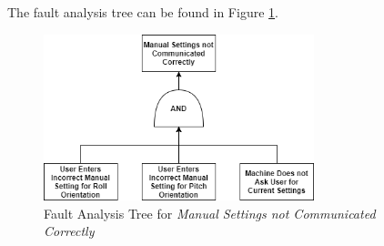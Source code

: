 \documentclass[11pt]{article}
\begin{document}
The fault analysis tree can be found in Figure \ref{fig:ft-settings}.

\begin{figure}[H]
	\centering
	\includegraphics[width=0.7\textwidth]{img/ft-settings.png} %
	\caption{Fault Analysis Tree for \textit{Manual Settings not Communicated Correctly}}
	\label{fig:ft-settings}
\end{figure}
\end{document}

